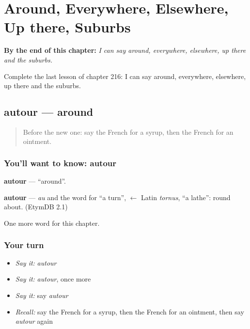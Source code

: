 
\chapter{Around, Everywhere, Elsewhere, Up there, Suburbs}
\label{ch:fr-around-everywhere-elsewhere-up-there-suburbs}

\begin{chapteropening}
\textbf{By the end of this chapter:} \emph{I can say around, everywhere, elsewhere, up there and the suburbs.}

Complete the last lesson of chapter 216: I can say around, everywhere, elsewhere, up there and the suburbs.
\end{chapteropening}

\section[autour]{autour — around}

\label{lesson:FR-C216-autour}



\begin{quote}
Before the new one: say the French for a syrup, then the French for an ointment.
\end{quote}

\subsection*{You'll want to know: autour}
\textbf{autour} — \textquotedblleft{}around\textquotedblright{}.

\begin{cousinweb}
\textbf{autour} — \emph{au} and the word for \textquotedblleft{}a turn\textquotedblright{}, $\leftarrow$ Latin \emph{tornus}, \textquotedblleft{}a lathe\textquotedblright{}: round about. (EtymDB 2.1)
\end{cousinweb}

\begin{grammarlens}[title={What you've built}]
One more word for this chapter.
\end{grammarlens}

\subsection*{Your turn}
\begin{itemize}
\raggedright
  \item \emph{Say it:} \emph{autour}
  \item \emph{Say it:} \emph{autour}, once more
  \item \emph{Say it:} say \emph{autour}
  \item \emph{Recall:} say the French for a syrup, then the French for an ointment, then say \emph{autour} again
\end{itemize}

